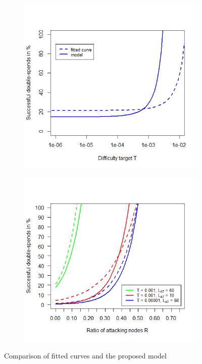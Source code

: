 \documentclass[a4paper,12pt,twoside]{report}
\begin{document}
\begin{figure}
\begin{subfigure}{.495\textwidth}
\end{subfigure}
\begin{subfigure}{.495\textwidth}
  \centering
  \includegraphics[width=\linewidth]{Comparison/Difficulty/difficultyfit.png}
\end{subfigure}
\begin{subfigure}{.495\textwidth}
  \centering
  \includegraphics[width=\linewidth]{Comparison/Difficulty/diffrat.png}
\end{subfigure}
\caption{Comparison of fitted curves and the proposed model}
\label{comp2}
\end{figure}
\end{document}
